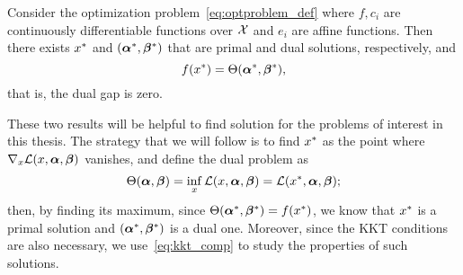 \begin{theorem}\label{th:strong_duality}
    Consider the optimization problem~\eqref{eq:optproblem_def} where $f, c_i$ are continuously differentiable functions over $\mathcal{X}$ and $e_i$ are affine functions. Then there exists ${x}^*$ and $({\bm{\alpha}}^*, {\bm{\beta}}^*)$ that are primal and dual solutions, respectively, and
    $$ f({x}^*) = \Theta({\bm{\alpha}}^*, {\bm{\beta}}^*), $$
    that is, the dual gap is zero.
\end{theorem}
These two results will be helpful to find solution for the problems of interest in this thesis. The strategy that we will follow is to find ${x}^*$ as the point where $\nabla_x \mathcal{L}(x, \bm{\alpha}, \bm{\beta}) $ vanishes, and define the dual problem as
\begin{equation}
    \nonumber
    \Theta(\bm{\alpha}, \bm{\beta}) = \inf_{x} \mathcal{L}(x, \bm{\alpha}, \bm{\beta}) =  \mathcal{L}({x}^*, \bm{\alpha}, \bm{\beta}) ;
\end{equation}
then, by finding its maximum, since $\Theta({\bm{\alpha}}^*, {\bm{\beta}}^*) = f({x}^*)$, we know that ${x}^*$ is a primal solution and $({\bm{\alpha}}^*, {\bm{\beta}}^*)$ is a dual one. Moreover, since the KKT conditions are also necessary, we use~\eqref{eq:kkt_comp} to study the properties of such solutions.



